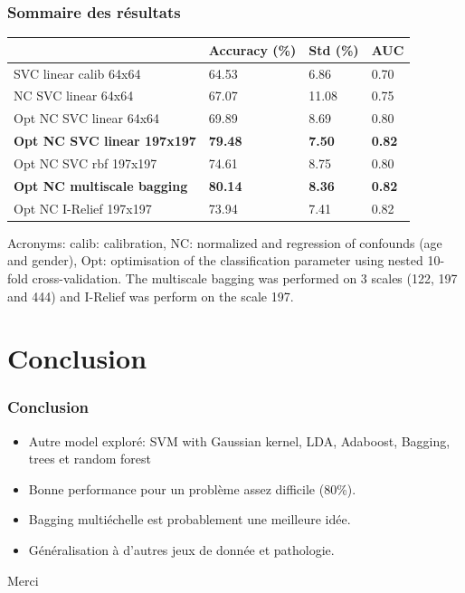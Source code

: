 \documentclass{beamer}
\begin{document}
\begin{frame}
\frametitle{Sommaire des résultats}
\begin{table}[h]
\begin{tabular}{llll}
\hline
                                   & Accuracy (\%)  & Std (\%)      & AUC           \\ \hline
SVC linear calib 64x64             & 64.53          & 6.86          & 0.70          \\
NC SVC linear 64x64                & 67.07          & 11.08         & 0.75          \\
Opt NC SVC linear 64x64            & 69.89          & 8.69          & 0.80          \\
\textbf{Opt NC SVC linear 197x197} & \textbf{79.48} & \textbf{7.50} & \textbf{0.82} \\
Opt NC SVC rbf 197x197             & 74.61          & 8.75          & 0.80          \\
\textbf{Opt NC multiscale bagging} & \textbf{80.14} & \textbf{8.36} & \textbf{0.82} \\
Opt NC I-Relief 197x197            & 73.94          & 7.41          & 0.82          \\ \hline
\end{tabular}
\label{tab_results}
\tiny{Acronyms: calib: calibration, NC: normalized and regression of confounds (age and gender), Opt: optimisation of the classification parameter using nested 10-fold cross-validation. The multiscale bagging was performed on 3 scales (122, 197 and 444) and I-Relief was perform on the scale 197. }
\end{table}
\end{frame}

\section{Conclusion}
\frame{\sectionpage}

\begin{frame}
\frametitle{Conclusion}

\hfill\break
\begin{itemize}
\item Autre model exploré: SVM with Gaussian kernel, LDA, Adaboost, Bagging, trees et random forest
\item Bonne performance pour un problème assez difficile (80\%).
\item Bagging multiéchelle est probablement une meilleure idée.
\item Généralisation à d'autres jeux de donnée et pathologie.
\end{itemize}
\end{frame}


\begin{frame}
\Huge{\centerline{Merci}}
\end{frame}

\end{document}
